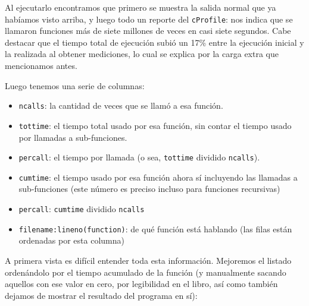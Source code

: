Al ejecutarlo encontramos que primero se muestra la salida normal que ya habíamos visto arriba, y luego todo un reporte del \texttt{cProfile}: nos indica que se llamaron funciones más de siete millones de veces en casi siete segundos. Cabe destacar que el tiempo total de ejecución subió un 17\% entre la ejecución inicial y la realizada al obtener mediciones, lo cual se explica por la carga extra que mencionamos antes.

Luego tenemos una serie de columnas:

\begin{itemize}
    \item \texttt{ncalls}: la cantidad de veces que se llamó a esa función.
    \item \texttt{tottime}: el tiempo total usado por esa función, sin contar el tiempo usado por llamadas a sub-funciones.
    \item \texttt{percall}: el tiempo por llamada (o sea, \texttt{tottime} dividido \texttt{ncalls}).
    \item \texttt{cumtime}:  el tiempo usado por esa función ahora sí incluyendo las llamadas a sub-funciones (este número es preciso incluso para funciones recursivas)
    \item \texttt{percall}: \texttt{cumtime} dividido \texttt{ncalls}
    \item \texttt{filename:lineno(function)}: de qué función está hablando (las filas están ordenadas por esta columna)
\end{itemize}

A primera vista es difícil entender toda esta información. Mejoremos el listado ordenándolo por el tiempo acumulado de la función (y manualmente sacando aquellos con ese valor en cero, por legibilidad en el libro, así como también dejamos de mostrar el resultado del programa en sí):

